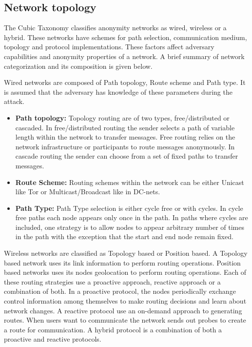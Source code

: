 \documentclass{llncs}
\begin{document}
\subsection{ Network topology}
The Cubic Taxonomy \cite{kelly2012exploring} classifies anonymity networks as wired, wireless or a hybrid. These networks have schemes for  path selection, communication medium, topology and protocol implementations. These factors affect adversary capabilities and anonymity properties of a network. A brief summary of network categorization and its composition is given below.

Wired networks are composed of Path topology, Route scheme and Path type. It is assumed that the adversary has knowledge of these parameters during the attack. 
\begin{itemize}
	\item[]{\textbf{Path topology:} Topology routing are of two types, free/distributed or cascaded. In free/distributed routing the sender selects a path of variable length within the network to transfer messages. Free routing relies on the network infrastructure or participants to route messages anonymously. In cascade routing the sender can choose from a set of fixed paths to transfer messages.}
	\item[]{\textbf{Route Scheme:} Routing schemes within the network can be either Unicast like Tor or Multicast/Broadcast like in DC-nets. }
	\item[]{\textbf{Path Type:} Path Type selection is either cycle free or with cycles. In cycle free paths each node appears only once in the path. In paths where cycles are included, one strategy is to allow nodes to appear arbitrary number of times in the path with the exception that the start and end node remain fixed.}
\end{itemize}

Wireless networks are classified as Topology based or Position based. A Topology based network uses its link information to perform routing operations. Position based networks uses its nodes geolocation to perform routing operations. Each of these routing strategies use a proactive approach, reactive approach or a combination of both. In a proactive protocol, the nodes periodically exchange control information among themselves to make routing decisions and learn about network changes. A reactive protocol use an on-demand approach to generating routes. When users want to communicate the network sends out probes to create a route for communication. A hybrid protocol is a combination of both a proactive and reactive protocols.
\end{document}
